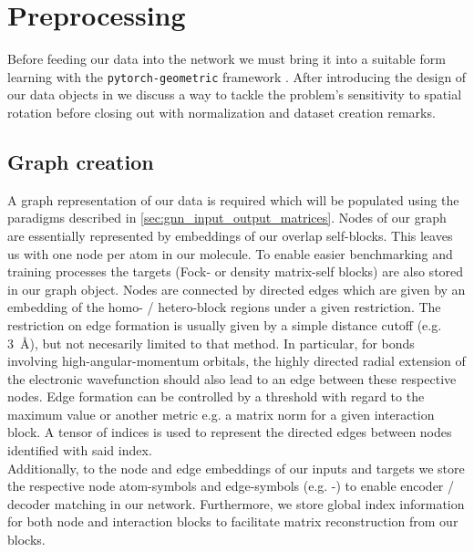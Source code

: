 \section{Preprocessing}
\label{sec:gnn_preproc}
Before feeding our data into the network we must bring it into a suitable form learning with the \texttt{pytorch-geometric} framework \parencite{ref:PyTorchGeometric, ref:PyTorch_geom_paper}. After introducing the design of our data objects in we discuss a way to tackle the problem's sensitivity to spatial rotation before closing out with normalization and dataset creation remarks. 
\subsection{Graph creation}
\label{subsec:gnn_graph_creation}
A graph representation of our data is required which will be populated using the paradigms described in \autoref{sec:gnn_input_output_matrices}. Nodes of our graph are essentially represented by embeddings of our overlap self-blocks. This leaves us with one node per atom in our molecule. To enable easier benchmarking and training processes the targets (Fock- or density matrix-self blocks) are also stored in our graph object. Nodes are connected by directed edges which are given by an embedding of the homo- / hetero-block regions under a given restriction. The restriction on edge formation is usually given by a simple distance cutoff (e.g. \SI{3}{\angstrom}), but not necesarily limited to that method. In particular, for bonds involving high-angular-momentum orbitals, the highly directed radial extension of the electronic wavefunction should also lead to an edge between these respective nodes. Edge formation can be controlled by a threshold with regard to the maximum value or another metric e.g. a matrix norm for a given interaction block. A tensor of indices is used to represent the directed edges between nodes identified with said index.\\

Additionally, to the node and edge embeddings of our inputs and targets we store the respective node atom-symbols and edge-symbols (e.g. -) to enable encoder / decoder matching in our network. Furthermore, we store global index information for both node and interaction blocks to facilitate matrix reconstruction from our blocks. 

